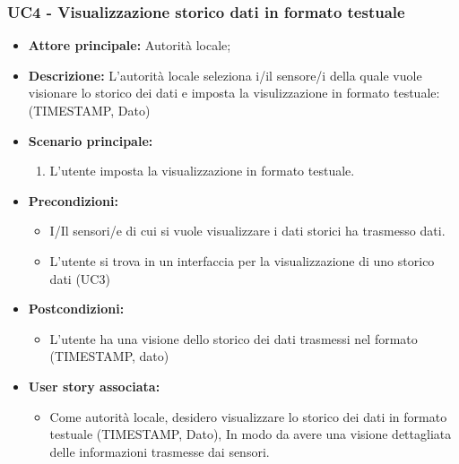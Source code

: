 \documentclass{article}
\begin{document}
\subsubsection{UC4 - Visualizzazione storico dati in formato testuale}
\begin{itemize}
    \item \textbf{Attore principale:} Autorità locale;
    \item \textbf{Descrizione:} L’autorità locale seleziona i/il sensore/i della quale vuole visionare lo storico dei dati e imposta la visulizzazione in formato testuale: (TIMESTAMP, Dato)
    \item \textbf{Scenario principale:}
          \begin{enumerate}
              \item L'utente imposta la visualizzazione in formato testuale.
          \end{enumerate}
    \item \textbf{Precondizioni:}
          \begin{itemize}
              \item  I/Il sensori/e di cui si vuole visualizzare i dati storici ha trasmesso dati.
              \item  L'utente si trova in un interfaccia per la visualizzazione di uno storico dati (UC3)
          \end{itemize}
    \item \textbf{Postcondizioni:}
          \begin{itemize}
              \item  L'utente ha una visione dello storico dei dati trasmessi nel formato (TIMESTAMP, dato)
          \end{itemize}
    \item \textbf{User story associata:}
          \begin{itemize}
              \item Come autorità locale,
                    desidero visualizzare lo storico dei dati in formato testuale (TIMESTAMP, Dato),
                    In modo da avere una visione dettagliata delle informazioni trasmesse dai sensori.
          \end{itemize}
\end{itemize}
\end{document}
